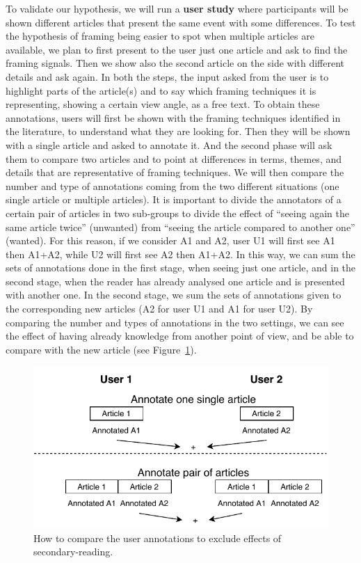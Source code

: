 

To validate our hypothesis, we will run a \textbf{user study} where participants will be shown different articles that present the same event with some differences.
To test the hypothesis of framing being easier to spot when multiple articles are available, we plan to first present to the user just one article and ask to find the framing signals. Then we show also the second article on the side with different details and ask again.
In both the steps, the input asked from the user is to highlight parts of the article(s) and to say which framing techniques it is representing, showing a certain view angle, as a free text.
To obtain these annotations, users will first be shown with the framing techniques identified in the literature, to understand what they are looking for.
Then they will be shown with a single article and asked to annotate it. And the second phase will ask them to compare two articles and to point at differences in terms, themes, and details that are representative of framing techniques.
We will then compare the number and type of annotations coming from the two different situations (one single article or multiple articles).
It is important to divide the annotators of a certain pair of articles in two sub-groups to divide the effect of ``seeing again the same article twice'' (unwanted) from ``seeing the article compared to another one'' (wanted).
For this reason, if we consider A1 and A2, user U1 will first see A1 then A1+A2, while U2 will first see A2 then A1+A2.
In this way, we can sum the sets of annotations done in the first stage, when seeing just one article, and in the second stage, when the reader has already analysed one article and is presented with another one. In the second stage, we sum the sets of annotations given to the corresponding new articles (A2 for user U1 and A1 for user U2).
By comparing the number and types of annotations in the two settings, we can see the effect of having already knowledge from another point of view, and be able to compare with the new article (see Figure~\ref{fig:user_study}).


\begin{figure}[!htb]
    \centering
    \includegraphics[width=0.7\linewidth]{figures/diagram-user-study-flow.pdf}
    \caption{How to compare the user annotations to exclude effects of secondary-reading.}
    \label{fig:user_study}
\end{figure}


